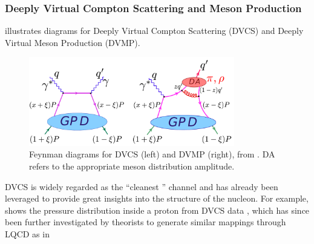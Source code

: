         \subsubsection*{Deeply Virtual Compton Scattering and Meson Production}
         illustrates diagrams for Deeply Virtual Compton Scattering (DVCS) and Deeply Virtual Meson Production (DVMP). 
    
        \begin{figure}[H]
            \centering
            \includegraphics[width=0.8\textwidth]{Chapters/Ch1-Intro/Ch1-Sec2-GPDs-DVMP/pics/valery_dvep.png}
            \caption[DVCS and DVMP Feynman Diagrams]{Feynman diagrams for DVCS (left) and DVMP (right), from  \parencite{Kubarovsky2011DeeplyCLAS}. DA refers to the appropriate meson distribution amplitude.}
            \label{fig:dvep_diagram}
        \end{figure}

        DVCS is widely regarded as the ``cleanest '' channel and has already been leveraged to provide great insights into the structure of the nucleon. For example,  shows the pressure distribution inside a proton from DVCS data \parencite{Burkert2018TheProton}, which has since been further investigated by theorists to generate similar mappings through LQCD as in 

